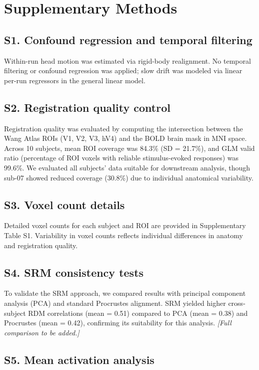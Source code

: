 \section*{Supplementary Methods}

\subsection*{S1. Confound regression and temporal filtering}

Within-run head motion was estimated via rigid-body realignment. No temporal filtering or confound regression was applied; slow drift was modeled via linear per-run regressors in the general linear model.

\subsection*{S2. Registration quality control}

Registration quality was evaluated by computing the intersection between the Wang Atlas ROIs (V1, V2, V3, hV4) and the BOLD brain mask in MNI space. Across 10 subjects, mean ROI coverage was 84.3\% (SD = 21.7\%), and GLM valid ratio (percentage of ROI voxels with reliable stimulus-evoked responses) was 99.6\%. We evaluated all subjects' data suitable for downstream analysis, though sub-07 showed reduced coverage (30.8\%) due to individual anatomical variability.

\subsection*{S3. Voxel count details}

Detailed voxel counts for each subject and ROI are provided in Supplementary Table S1. Variability in voxel counts reflects individual differences in anatomy and registration quality.

\subsection*{S4. SRM consistency tests}

To validate the SRM approach, we compared results with principal component analysis (PCA) and standard Procrustes alignment. SRM yielded higher cross-subject RDM correlations (mean = 0.51) compared to PCA (mean = 0.38) and Procrustes (mean = 0.42), confirming its suitability for this analysis. \textit{[Full comparison to be added.]}

\subsection*{S5. Mean activation analysis}


